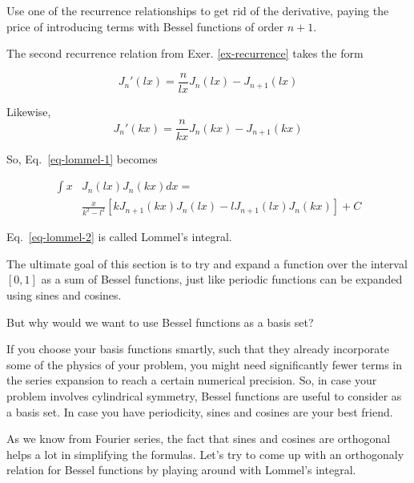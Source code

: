 \begin{cue}
Use one of the recurrence relationships to get rid of the derivative, paying the price of introducing terms with Bessel functions of order $n+1$.
\end{cue}

The second recurrence relation from Exer. \ref{ex-recurrence} takes the form

\begin{equation}
J_n'(lx) =  \frac{n}{lx}J_n(lx)-J_{n+1}(lx)
\end{equation} 

Likewise,
\begin{equation}
J_n'(kx) =  \frac{n}{kx}J_n(kx)-J_{n+1}(kx)
\end{equation} 

So, Eq.~\ref{eq-lommel-1} becomes

\begin{align}
  \int x & J_n(lx)J_n(kx)dx = \nonumber \\
  & \frac{x}{k^2 - l^2} \left[{k J_{n+1}(kx) J_n(lx) - l J_{n+1}(lx) J_n(kx)}\right] + C \label{eq-lommel-2}
\end{align} 

Eq.~\ref{eq-lommel-2} is called Lommel's integral.


\pagebreak


\label{week4}

The ultimate goal of this section is to try and expand a function over the interval $[0,1]$ as a sum of Bessel functions, just like periodic functions can be expanded using sines and cosines.

\begin{cue}
But why would we want to use Bessel functions as a basis set?
\end{cue}

If you choose your basis functions smartly, such that they already incorporate some of the physics of your problem, you might need significantly fewer terms in the series expansion to reach a certain numerical precision. So, in case your problem involves cylindrical symmetry, Bessel functions are useful to consider as a basis set. In case you have periodicity, sines and cosines are your best friend.

As we know from Fourier series, the fact that sines and cosines are orthogonal helps a lot in simplifying the formulas. Let's try to come up with an orthogonaly relation for Bessel functions by playing around with Lommel's integral.

